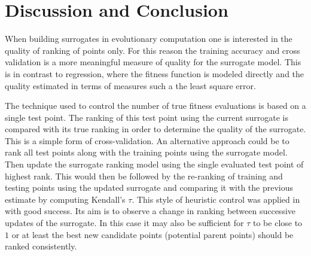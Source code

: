 \documentclass[10pt]{llncs}
\begin{document}
\section{Discussion and Conclusion}\label{sec:Discussion}

When building surrogates in evolutionary computation one is
interested in the quality of ranking of points only. For this
reason the training accuracy and cross validation is a more
meaningful measure of quality for the surrogate model. This is in
contrast to regression, where the fitness function is modeled
directly and the quality estimated in terms of measures such a
the least square error. 

The technique used to control the number of true fitness
evaluations is based on a single test point. The ranking of this
test point using the current surrogate is compared with its true
ranking in order to determine the quality of the surrogate. This
is a simple form of cross-validation. An alternative approach
could be to rank all test points along with the training points
using the surrogate model. Then update the surrogate ranking
model using the single evaluated test point of highest rank.
This would then be followed by the re-ranking of training and
testing points using the updated surrogate and comparing it with
the previous estimate by computing Kendall's $\tau$. This style
of heuristic control was applied in \cite{Ru04:PPSN} with good
success. Its aim is to observe a change in ranking between
successive updates of the surrogate. In this case it may also be
sufficient for $\tau$ to be close to $1$ or at least the best
new candidate points (potential parent points) should be ranked
consistently.






\end{document}
